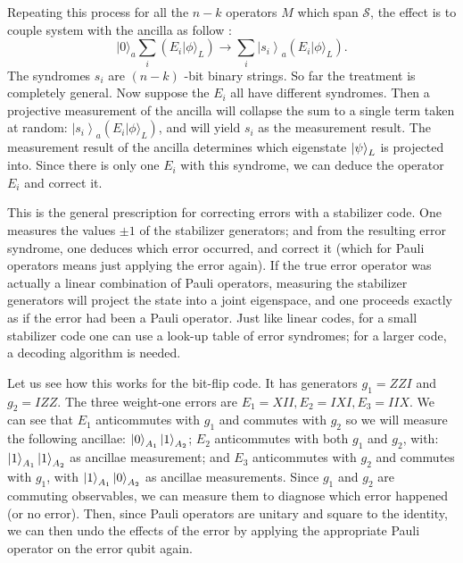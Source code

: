 Repeating this process for all the $n-k$ operators $M$ which span $\mathcal{S}$, the effect is to couple system with the ancilla as follow \cite{SteaneTut}:
$$
|0\rangle_{a} \sum_{i}\left(E_{i}|\phi\rangle_{L}\right) \rightarrow \sum_{i}\left|s_{i}\right\rangle_{a}\left(E_{i}|\phi\rangle_{L}\right).
$$
The syndromes $s_{i}$ are $(n-k)$ -bit binary strings. So far the treatment is completely general.
Now suppose the $E_{i}$ all have different syndromes. Then a projective measurement of the ancilla will collapse the sum to a single term taken at random: $\left|s_{i}\right\rangle_{a}\left(E_{i}|\phi\rangle_{L}\right)$, and will yield $s_{i}$ as the measurement result. 
The measurement result of the ancilla determines which eigenstate $\ket{\psi}_L$ is projected into.
Since there is only one $E_{i}$ with this syndrome, we can deduce the operator $E_{i}$ and correct it. 

This is the general prescription for correcting errors with a stabilizer code. One measures the values $\pm 1$ of the stabilizer generators; and from the resulting error syndrome, one deduces which error occurred, and correct it (which for Pauli operators means just applying the error again). If the true error operator was actually a linear combination of Pauli operators, measuring the stabilizer generators will project the state into a joint eigenspace, and one proceeds exactly as if the error had been a Pauli operator. Just like linear codes, for a small stabilizer code one can use a look-up table of error syndromes; for a larger code, a decoding algorithm is needed.



Let us see how this works for the bit-flip code. It has generators $g_{1}=Z Z I$ and $g_{2}=I Z Z$. The three weight-one errors are $E_{1}=X I I, E_{2}=I X I, E_{3}=I I X .$ We can see that $E_{1}$ anticommutes with $g_{1}$ and commutes with $g_{2}$ so we will measure the following ancillae: $\ket{0}_{A_1} \ket{1}_{A_2}$; $E_{2}$ anticommutes with both $g_{1}$ and $g_{2}$, with: $\ket{1}_{A_1} \ket{1}_{A_2}$ as ancillae measurement; and $E_{3}$ anticommutes with $g_{2}$ and commutes with $g_{1}$, with  $\ket{1}_{A_1} \ket{0}_{A_2}$ as ancillae measurements. Since $g_{1}$ and $g_{2}$ are commuting observables, we can measure them to diagnose which error happened (or no error). Then, since Pauli operators are unitary and square to the identity, we can then undo the effects of the error by applying the appropriate Pauli operator on the error qubit again.

